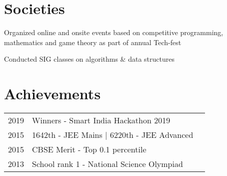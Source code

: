 \documentclass[]{deedy-resume-openfont}
\begin{document}
\begin{minipage}[t]{0.66\textwidth}
\section{Societies} 
\vspace{1pt}
\begin{tightemize}
\item
Organized online and onsite events based on competitive programming, mathematics and game theory as part of annual Tech-fest \\
\item 
Conducted SIG classes on algorithms \& data structures   
\end{tightemize}
\sectionsep


\section{Achievements} 
\begin{tabular}{rll}
2019 & Winners - Smart India Hackathon 2019 \\
2015 & 1642th - JEE Mains \hspace{1pt}|\hspace{1pt} 6220th - JEE Advanced \\
2015 & CBSE Merit - Top 0.1 percentile \\
2013 & School rank 1 - National Science Olympiad
\end{tabular}
\sectionsep


\end{minipage} 
\end{document}
